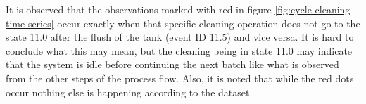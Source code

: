 \documentclass[../Thesis.tex]{subfiles}
\begin{document}
It is observed that the observations marked with red in figure \ref{fig:cycle cleaning time series} occur exactly when that specific cleaning operation does not go to the state 11.0 after the flush of the tank (event ID 11.5) and vice versa. It is hard to conclude what this may mean, but the cleaning being in state 11.0 may indicate that the system is idle before continuing the next batch like what is observed from the other steps of the process flow. Also, it is noted that while the red dots occur nothing else is happening according to the dataset.


\end{document}
